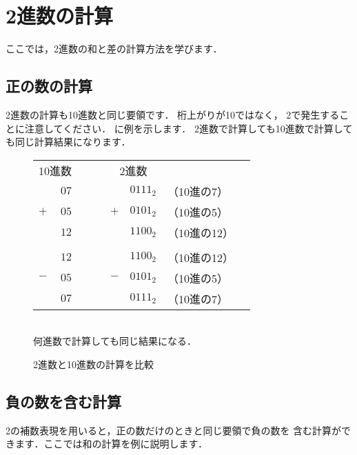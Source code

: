 \newpage
\section{2進数の計算}

ここでは，2進数の和と差の計算方法を学びます．

\subsection{正の数の計算}
2進数の計算も10進数と同じ要領です．
桁上がりが10ではなく，
2で発生することに注意してください．
に例を示します．
2進数で計算しても10進数で計算しても同じ計算結果になります．

\begin{figure}[tbp]
\begin{center}
{\small\begin{tabular}{  l r l  l r l l}
\multicolumn{2}{c}{10進数}  & ~~~  & \multicolumn{2}{c}{2進数} & \\
                     & $07$ &      &     & $0111_2$ & （10進の7） \\
                 $+$ & $05$ &      & $+$ & $0101_2$ & （10進の5） \\
\cline{1-2} \cline{4-5}
                     & $12$ &      &     & $1100_2$ & （10進の12） \\
&&&&&&\\
                     & $12$ &      &     & $1100_2$ & （10進の12） \\
                 $-$ & $05$ &      & $-$ & $0101_2$ & （10進の5） \\
\cline{1-2} \cline{4-5}
                     & $07$ &      &     & $0111_2$ & （10進の7） \\
\end{tabular}\\
\vspace{0.2cm}
何進数で計算しても同じ結果になる．
}
\caption{2進数と10進数の計算を比較}
\label{fig:chap2:cal2vs10}
\end{center}
\end{figure}

\subsection{負の数を含む計算}

2の補数表現を用いると，正の数だけのときと同じ要領で負の数を
含む計算ができます．ここでは和の計算を例に説明します．

